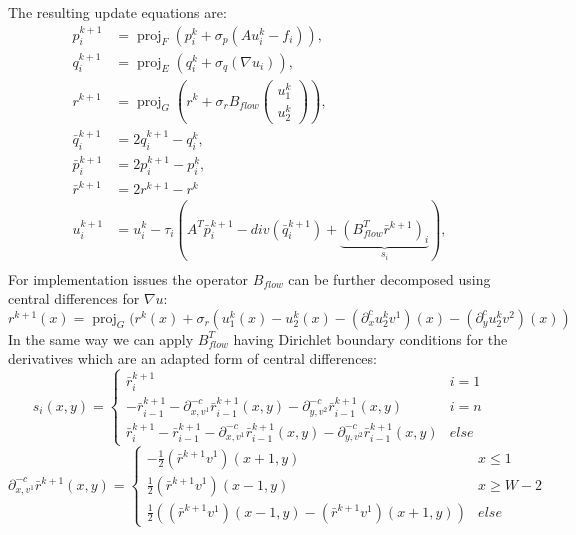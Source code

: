 \documentclass[A4,12pt]{article}
\DeclareMathOperator*{\proj}{proj}
\begin{document}
The resulting update equations are:
\begin{equation}
\begin{aligned}
p_i^{k+1}&=\proj_F(p_i^k + \sigma_p (Au_i^k - f_i)), \\
q_i^{k+1}&=\proj_E(q_i^k + \sigma_q (\nabla u_i)), \\
r^{k+1}&=\proj_G\left(r^{k} + \sigma_r B_{flow}\begin{pmatrix}u_1^k \\ u_2^k\end{pmatrix}\right), \\
\bar q_i^{k+1} &= 2q_i^{k+1} - q_i^k,\\
\bar p_i^{k+1} &= 2p_i^{k+1} - p_i^k,\\
\bar r^{k+1} &= 2r^{k+1} - r^k\\
u_i^{k+1}&=u_i^k-\tau_i(A^T\bar p_i^{k+1}-div(\bar q_i^{k+1})+\underbrace{(B_{flow}^T\bar r^{k+1})_i}_{s_i}), \\
\end{aligned}
\end{equation}
For implementation issues the operator $B_{flow}$ can be further decomposed using central differences for $\nabla u$:
\begin{equation}
r^{k+1}(x) = \proj_G(r^{k}(x) + \sigma_r(u_1^k(x)-u_2^k(x)-(\partial^c_x u_2^kv^1)(x)-(\partial^c_y u_2^kv^2)(x))
\end{equation}
In the same way we can apply $B_{flow}^T$ having Dirichlet boundary conditions for the derivatives which are an adapted form of central differences:
\begin{equation}
s_i(x, y) =
\begin{cases}
\bar r_i^{k+1} & i=1 \\
-\bar r_{i-1}^{k+1} - \partial^{-c}_{x, v^1}\bar r_{i-1}^{k+1} (x, y) - \partial^{-c}_{y, v^2} \bar r_{i-1}^{k+1} (x, y) & i=n \\
\bar r_i^{k+1} - \bar r_{i-1}^{k+1} - \partial^{-c}_{x, v^1}\bar r_{i-1}^{k+1} (x, y) - \partial^{-c}_{y, v^2} \bar r_{i-1}^{k+1} (x, y) & else
\end{cases}
\end{equation}
\begin{equation}
\partial^{-c}_{x, v^1} \bar r^{k+1} (x, y) =
\begin{cases}
-\frac{1}{2} (\bar r^{k+1} v^1)(x+1, y) & x \leq 1 \\
\frac{1}{2} (\bar r^{k+1} v^1)(x-1, y) & x \geq W - 2 \\
\frac{1}{2} \left((\bar r^{k+1} v^1)(x-1, y) - (\bar r^{k+1} v^1)(x+1, y)\right) & else
\end{cases}
\end{equation}
\end{document}
